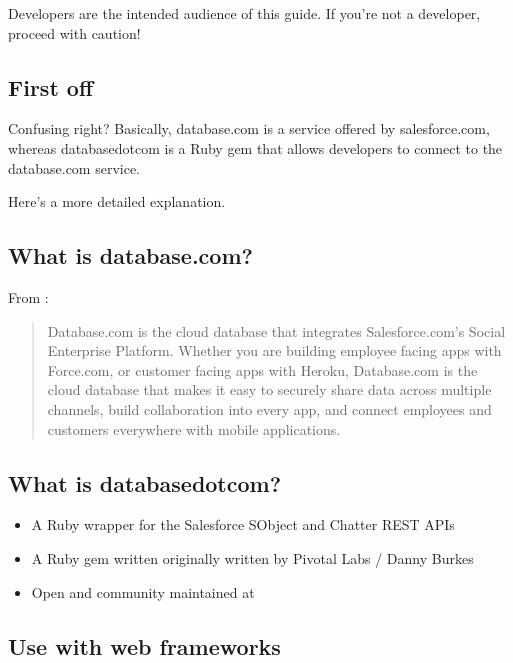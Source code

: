 \documentclass{article}
\begin{document}
Developers are the intended audience of this guide. If you'{}re not a developer, proceed with caution!

\hypertarget{first_off}{}\subsection*{{First off}}\label{first_off}

{\colorbox[rgb]{1.00,0.93,1.00}{\tt {}}}

Confusing right? Basically, database.com is a service offered by salesforce.com, whereas databasedotcom is a Ruby gem that allows developers to connect to the database.com service.

Here'{}s a more detailed explanation.

\hypertarget{what_is_databasecom}{}\subsection*{{What is database.com?}}\label{what_is_databasecom}

From :

\begin{quote}%
Database.com is the cloud database that integrates Salesforce.com'{}s Social Enterprise Platform. Whether you are building employee facing apps with Force.com, or customer facing apps with Heroku, Database.com is the cloud database that makes it easy to securely share data across multiple channels, build collaboration into every app, and connect employees and customers everywhere with mobile applications.


\end{quote}
\hypertarget{what_is_databasedotcom}{}\subsection*{{What is databasedotcom?}}\label{what_is_databasedotcom}

\begin{itemize}%
\item A Ruby wrapper for the Salesforce SObject and Chatter REST APIs
\item A Ruby gem written originally written by Pivotal Labs / Danny Burkes
\item Open and community maintained at 

\end{itemize}
\hypertarget{use_with_web_frameworks}{}\subsection*{{Use with web frameworks}}\label{use_with_web_frameworks}
\end{document}
